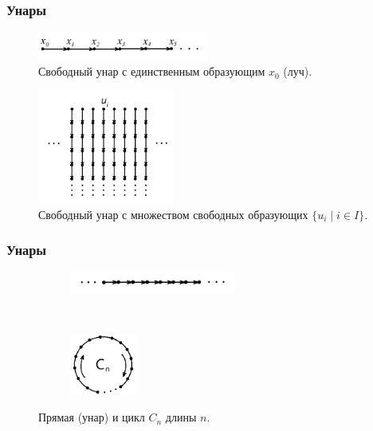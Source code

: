 \documentclass[11pt, notheorems]{beamer}
\begin{document}
\begin{frame}
	\frametitle{Унары}

	\begin{figure}
		\center
		\includegraphics[width=0.5\textwidth]{free_unar_1}
		\caption{Свободный унар с единственным образующим $x_0$ (луч).}
	\end{figure}

	\begin{figure}
		\center
		\includegraphics[width=0.4\textwidth]{free_unar_2}
		\caption{Свободный унар с множеством свободных образующих $\{ u_i \mid i \in I \}$.}
	\end{figure}
\end{frame}

\begin{frame}
	\frametitle{Унары}

	\begin{figure}[t!]
		\centering
		\begin{subfigure}[t]{0.45\textwidth}
			\centering
			\includegraphics[height=7mm]{line.png}
		\end{subfigure}
		~
		\begin{subfigure}[t]{0.45\textwidth}
			\centering
			\includegraphics[height=2cm]{cycle.png}
		\end{subfigure}

		\caption{Прямая (унар) и цикл $C_n$ длины $n$.}
	\end{figure}
\end{frame}
\end{document}
